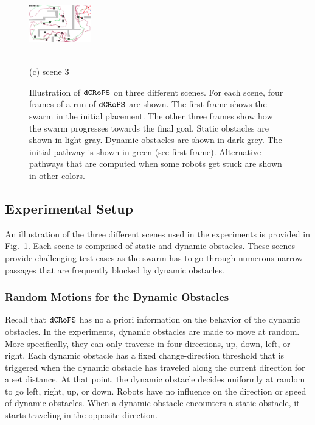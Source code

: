 \documentclass[letterpaper, 10pt, conference]{ieeeconf}
\newcommand{\Acronym}[1]{\ensuremath{{\small{\texttt{#1}}}}}
\newcommand{\Name}{\Acronym{dCRoPS}}
\begin{document}
\begin{figure}
\includegraphics[width=0.24\textwidth,height=1.35in,frame]{figs/maze2_4.png}\\[2mm]
(c) scene 3
\caption{Illustration of $\Name$ on three different scenes. For each
  scene, four frames of a run of $\Name$ are shown. The first frame shows the
  swarm in the initial placement. The other three frames show how the
  swarm progresses towards the final goal. Static obstacles are shown
  in light gray. Dynamic obstacles are shown in dark grey. The initial
pathway is shown in green (see first frame). Alternative pathways that
are computed when some robots get stuck are shown in other colors.}
\label{fig:Scenes}
\end{figure}


\subsection{Experimental Setup}

An illustration of the three different scenes used in the experiments
is provided in Fig.~\ref{fig:Scenes}. Each scene is comprised of
static and dynamic obstacles. These scenes provide challenging test
cases as the swarm has to go through numerous narrow passages that are
frequently blocked by dynamic obstacles. 


\subsubsection{Random Motions for the Dynamic Obstacles}
Recall that $\Name$ has no a
priori information on the behavior of the dynamic obstacles. In the
experiments, dynamic obstacles are made to move at random. More
specifically, they can only traverse in four directions, up, down,
left, or right. Each dynamic obstacle has a fixed change-direction
threshold that is triggered when the dynamic obstacle has
traveled along the current direction for a set distance. At that
point, the dynamic obstacle decides uniformly at random to go left,
right, up, or down. Robots have no influence on the direction or speed
of dynamic obstacles. When a dynamic obstacle encounters a static
obstacle, it starts traveling in the opposite direction.
\end{document}

